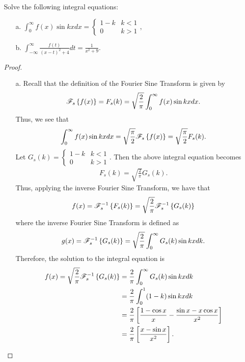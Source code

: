 \begin{problem}{3}
  Solve the following integral equations:
  \begin{enumerate}
    \item[a.] $\displaystyle \int_0^\infty f(x) \sin kx dx = \begin{cases} 1-k & k<1 \\ 0 & k > 1\end{cases}$,
    \item[b.] $\displaystyle \int_{-\infty}^\infty \frac{f(t)}{(x-t)^2 + 4}dt = \frac{1}{x^2+9}$.
  \end{enumerate}
\end{problem}

\begin{proof}
  \begin{enumerate}
    \item[a.] Recall that the definition of the Fourier Sine Transform is given by
      \begin{align*}
        \mathscr{F}_s\left\{ {f(x)} \right\} = F_s(k) = \sqrt{\frac{2}{\pi}}\int_{0}^\infty f(x) \sin kx dx.
      \end{align*}
      Thus, we see that
      \begin{align*}
        \int_0^\infty f(x) \sin kx dx = \sqrt{\frac{\pi}{2}} \mathscr{F}_s\left\{ {f(x)} \right\} = \sqrt{\frac{\pi}{2}} F_s(k).
      \end{align*}
      Let $\displaystyle G_s(k) = \begin{cases} 1-k & k<1 \\ 0 & k > 1\end{cases}$. Then the above integral equation becomes
      \begin{align*}
        F_s(k) = \sqrt{\frac{2}{\pi}}G_s(k).
      \end{align*}
      Thus, applying the inverse Fourier Sine Transform, we have that
      \begin{align*}
        f(x) = \mathscr{F}_s^{-1}\left\{ {F_s(k)} \right\} = \sqrt{\frac{2}{\pi}}\mathscr{F}_s^{-1}\left\{ {G_s(k)} \right\}
      \end{align*}
      where the inverse Fourier Sine Transform is defined as
      \begin{align}\label{fouriersininv}
        g(x) = \mathscr{F}_s^{-1}\left\{ {G_s(k)} \right\} = \sqrt{\frac{2}{\pi}}\int_0^\infty G_s(k)\sin kx dk.
      \end{align}
      Therefore, the solution to the integral equation is
      \begin{align*}
        f(x) = \sqrt{\frac{2}{\pi}}\mathscr{F}_s^{-1}\left\{ {G_s(k)} \right\} &= \frac{2}{\pi}\int_0^\infty G_s(k)\sin kx dk \\
        &= \frac{2}{\pi} \int_0^1 (1-k)\sin kx dk \\
        &= \frac{2}{\pi} \left[\frac{1-\cos x}{x} - \frac{\sin x - x \cos x}{x^2}\right] \\
        &= \frac{2}{\pi}\left[\frac{x - \sin x}{x^2}\right].
      \end{align*}


\end{enumerate}
\end{proof}
